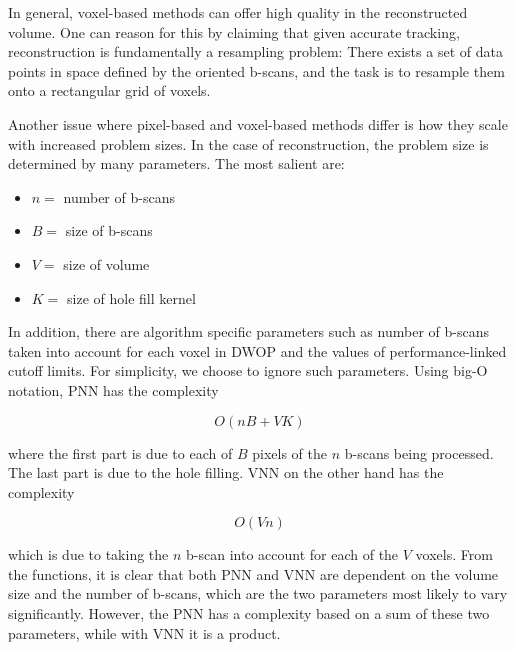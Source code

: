 	In general, voxel-based methods can offer high quality in the reconstructed volume. One can reason for this by claiming that given accurate tracking, reconstruction is fundamentally a resampling problem: There exists a set of data points in space defined by the oriented b-scans, and the task is to resample them onto a rectangular grid of voxels.
	
	Another issue where pixel-based and voxel-based methods differ is how they scale with increased problem sizes. 
	In the case of reconstruction, the problem size is determined by many parameters. The most salient are:
	
	\begin{itemize}
		\item $n =$ number of b-scans
		\item $B =$ size of b-scans
		\item $V =$ size of volume
		\item $K =$ size of hole fill kernel
	\end{itemize}
	
	In addition, there are algorithm specific parameters such as number of b-scans taken into account for each voxel in DWOP and the values of performance-linked cutoff limits. For simplicity, we choose to ignore such parameters. Using big-O notation, PNN has the complexity 
	
	\begin{equation}
		O(nB + VK)
	\end{equation}
	
	where the first part is due to each of $B$ pixels of the $n$ b-scans being processed. The last part is due to the hole filling. VNN on the other hand has the complexity
	
	\begin{equation}
		O(Vn)
	\end{equation}
	
	which is due to taking the $n$ b-scan into account for each of the $V$ voxels. From the functions, it is clear that both PNN and VNN are dependent on the volume size and the number of b-scans, which are the two parameters most likely to vary significantly. However, the PNN has a complexity based on a sum of these two parameters, while with VNN it is a product.
	
